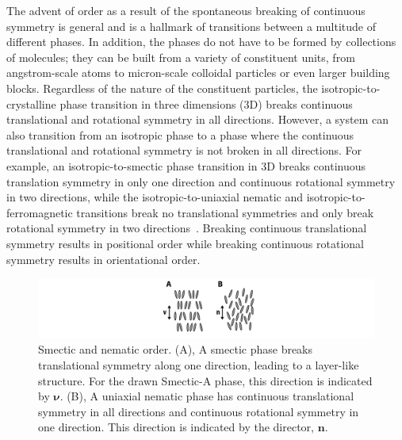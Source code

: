 The advent of order as a result of the spontaneous breaking of continuous symmetry is general and is a hallmark of transitions between a multitude of different phases.
In addition, the phases do not have to be formed by collections of molecules; they can be built from a variety of constituent units, from angstrom-scale atoms to micron-scale colloidal particles or even larger building blocks.
Regardless of the nature of the constituent particles, the isotropic-to-crystalline phase transition in three dimensions (3D) breaks continuous translational and rotational symmetry in all directions.
However, a system can also transition from an isotropic phase to a phase where the continuous translational and rotational symmetry is not broken in all directions.
For example, an isotropic-to-smectic phase transition in 3D breaks continuous translation symmetry in only one direction and continuous rotational symmetry in two directions, while the isotropic-to-uniaxial nematic and isotropic-to-ferromagnetic transitions break no translational symmetries and only break rotational symmetry in two directions~\cite{RN175}.
Breaking continuous translational symmetry results in positional order while breaking continuous rotational symmetry results in orientational order.
\begin{figure}
  \includegraphics{figures/C1/Ch1-Figs_SmecticNematic.png}
  \caption{Smectic and nematic order.
  (A), A smectic phase breaks translational symmetry along one direction, leading to a layer-like structure.
  For the drawn Smectic-A phase, this direction is indicated by $\bm{\nu}$.
  (B), A uniaxial nematic phase has continuous translational symmetry in all directions and continuous rotational symmetry in one direction. This direction is indicated by the director, $\mathbf{n}$.}\label{f:1-SmecticNematic}
\end{figure}

